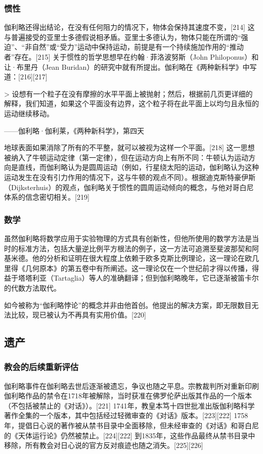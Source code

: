 \subsubsection{惯性}  

伽利略还得出结论，在没有任何阻力的情况下，物体会保持其速度不变，[214] 这与普遍接受的亚里士多德假说相矛盾。亚里士多德认为，物体只能在所谓的“强迫”、“非自然”或“受力”运动中保持运动，前提是有一个持续施加作用的“推动者”存在。[215] 关于惯性的哲学思想早在约翰·菲洛波努斯（John Philoponus）和让·布里丹（Jean Buridan）的研究中就有所提出。伽利略在《两种新科学》中写道：[216][217]  

> 设想有一个粒子在没有摩擦的水平平面上被抛射；然后，根据前几页更详细的解释，我们知道，如果这个平面没有边界，这个粒子将在此平面上以均匀且永恒的运动继续移动。

——伽利略·伽利莱，《两种新科学》，第四天  

地球表面如果消除了所有的不平整，就可以被视为这样一个平面。[218] 这一思想被纳入了牛顿运动定律（第一定律），但在运动方向上有所不同：牛顿认为运动方向是直线，而伽利略认为是圆周运动（例如，行星绕太阳的运动，伽利略认为这种运动发生在没有引力作用的情况下，这与牛顿的观点不同）。根据迪克斯特豪伊斯（Dijksterhuis）的观点，伽利略关于惯性的圆周运动倾向的概念，与他对哥白尼体系的信念密切相关。[219]
\subsubsection{数学} 
虽然伽利略将数学应用于实验物理的方式具有创新性，但他所使用的数学方法是当时的标准方法，包括大量逆比例平方根法的例子，这一方法可追溯至斐波那契和阿基米德。他的分析和证明在很大程度上依赖于欧多克斯比例理论，这一理论在欧几里得《几何原本》的第五卷中有所阐述。这一理论仅在一个世纪前才得以传播，得益于塔塔利亚（Tartaglia）等人的准确翻译；但到伽利略晚年，它已逐渐被笛卡尔的代数方法取代。  

如今被称为“伽利略悖论”的概念并非由他首创。他提出的解决方案，即无限数目无法比较，现已被认为不再具有实用价值。[220]
\subsection{遗产}  
\subsubsection{教会的后续重新评估} 
伽利略事件在伽利略去世后逐渐被遗忘，争议也随之平息。宗教裁判所对重新印刷伽利略作品的禁令在1718年被解除，当时获准在佛罗伦萨出版其作品的一个版本（不包括被禁止的《对话》）。[221] 1741年，教皇本笃十四世批准出版伽利略科学著作全集的一个版本，其中包括经过轻微审查的《对话》版本。[223][222] 1758年，提倡日心说的著作被从禁书目录中全面移除，但未经审查的《对话》和哥白尼的《天体运行论》仍然被禁止。[224][222] 到1835年，这些作品最终从禁书目录中移除，所有教会对日心说的官方反对痕迹也随之消失。[225][226]  

